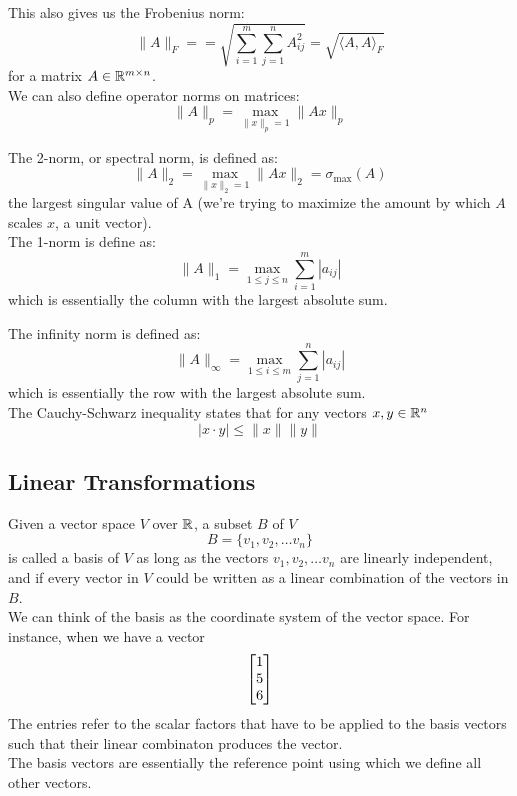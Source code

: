 \documentclass[12pt]{article}
\begin{document}
    This also gives us the Frobenius norm:
    \[ \| A \|_F = = 
    \sqrt{\sum_{i=1}^m\sum_{j=1}^n A_{ij}^2}
    = \sqrt{\langle A, A \rangle_F } \]
    for a matrix $A \in \mathbb{R}^{m \times n}$. \\

    We can also define operator norms on matrices:
    \[ \|A\|_p = \max_{\|x\|_p = 1}\|Ax\|_p \]
    
    The 2-norm, or spectral norm,
    is defined as:
    \[ \|A\|_2 = \max_{\|x\|_2 = 1}\|Ax\|_2
    = \sigma_{\max}(A) \]
    the largest singular value of A
    (we're trying to maximize the amount by which
    $A$ scales $x$, a unit vector). \\

    The 1-norm is define as:
    \[ \|A\|_1 = \max_{1 \leq j \leq n} \sum_{i = 1}^m |a_{ij}| \]
    which is essentially the column
    with the largest absolute sum.
     
    The infinity norm is defined as:
    \[ \|A\|_\infty = \max_{1 \leq i \leq m} 
    \sum_{j = 1}^n |a_{ij}| \]
    which is essentially the row
    with the largest absolute sum. \\

    The Cauchy-Schwarz inequality states that 
    for any vectors $x, y \in \mathbb{R}^n$
    \[|x \cdot y| \leq \|x\|\|y\|\]

    \newpage

    \subsection*{Linear Transformations}

    Given a vector space $V$ over $\mathbb{R}$,
    a subset $B$ of $V$
    \[ B = \{v_1, v_2, \dots v_n \} \]
    is called a basis of $V$ as long as the
    vectors $v_1, v_2, \dots v_n$ are linearly independent,
    and if every vector in $V$ could be written
    as a linear combination of the vectors in $B$. \\

    We can think of the basis as the coordinate
    system of the vector space.
    For instance, when we have a vector
    \[ \begin{bmatrix} 1 \\ 5 \\ 6 \end{bmatrix} \]
    The entries refer to the scalar factors
    that have to be applied to the basis vectors
    such that their linear combinaton produces
    the vector. \\
    The basis vectors are essentially the reference
    point using which we define all other vectors. \\ 
\end{document}
